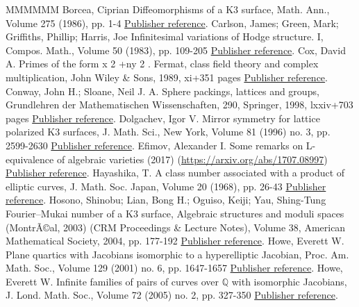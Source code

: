 \documentclass[11pt]{article}
\theoremstyle{definition}
\numberwithin{equation}{section}
\numberwithin{figure}{section}
\numberwithin{table}{section}
\begin{document}
\begin{thebibliography}{MMMMMM}
 Borcea, Ciprian Diffeomorphisms of a K3 surface, Math. Ann., Volume 275 (1986), pp. 1-4 \href{https://ahl.centre-mersenne.org/item/AHL_2018__1__227_0/#Borcea}{Publisher reference}.
 Carlson, James; Green, Mark; Griffiths, Phillip; Harris, Joe Infinitesimal variations of Hodge structure. I, Compos. Math., Volume 50 (1983), pp. 109-205 \href{https://ahl.centre-mersenne.org/item/AHL_2018__1__227_0/#CGGH}{Publisher reference}.
 Cox, David A. Primes of the form x 2 +ny 2 . Fermat, class field theory and complex multiplication, John Wiley \& Sons, 1989, xi+351 pages \href{https://ahl.centre-mersenne.org/item/AHL_2018__1__227_0/#Cox}{Publisher reference}.
 Conway, John H.; Sloane, Neil J. A. Sphere packings, lattices and groups, Grundlehren der Mathematischen Wissenschaften, 290, Springer, 1998, lxxiv+703 pages \href{https://ahl.centre-mersenne.org/item/AHL_2018__1__227_0/#Conway}{Publisher reference}.
 Dolgachev, Igor V. Mirror symmetry for lattice polarized K3 surfaces, J. Math. Sci., New York, Volume 81 (1996) no. 3, pp. 2599-2630 \href{https://ahl.centre-mersenne.org/item/AHL_2018__1__227_0/#Dolg}{Publisher reference}.
 Efimov, Alexander I. Some remarks on L-equivalence of algebraic varieties (2017) (\url{https://arxiv.org/abs/1707.08997}) \href{https://ahl.centre-mersenne.org/item/AHL_2018__1__227_0/#Ef}{Publisher reference}.
 Hayashika, T. A class number associated with a product of elliptic curves, J. Math. Soc. Japan, Volume 20 (1968), pp. 26-43 \href{https://ahl.centre-mersenne.org/item/AHL_2018__1__227_0/#Hay}{Publisher reference}.
 Hosono, Shinobu; Lian, Bong H.; Oguiso, Keiji; Yau, Shing-Tung Fourier–Mukai number of a K3 surface, Algebraic structures and moduli spaces (MontrÃ©al, 2003) (CRM Proceedings \& Lecture Notes), Volume 38, American Mathematical Society, 2004, pp. 177-192 \href{https://ahl.centre-mersenne.org/item/AHL_2018__1__227_0/#Hosono}{Publisher reference}.
 Howe, Everett W. Plane quartics with Jacobians isomorphic to a hyperelliptic Jacobian, Proc. Am. Math. Soc., Volume 129 (2001) no. 6, pp. 1647-1657 \href{https://ahl.centre-mersenne.org/item/AHL_2018__1__227_0/#Howe1}{Publisher reference}.
 Howe, Everett W. Infinite families of pairs of curves over \(\mathbb{Q}\) with isomorphic Jacobians, J. Lond. Math. Soc., Volume 72 (2005) no. 2, pp. 327-350 \href{https://ahl.centre-mersenne.org/item/AHL_2018__1__227_0/#Howe2}{Publisher reference}.

\end{thebibliography}
\end{document}
